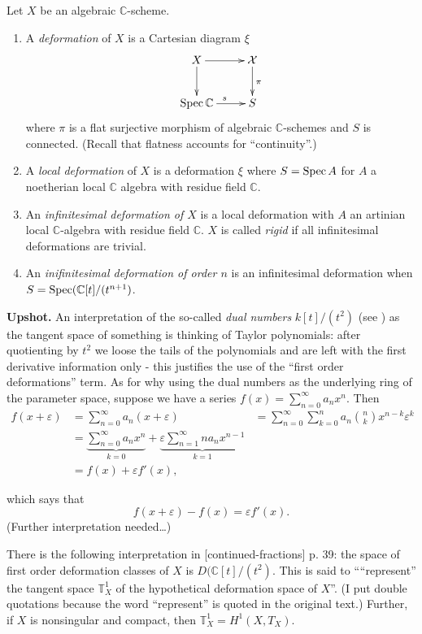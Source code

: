 \begin{definition}
\label{definition-deformation}
Let $X$ be an algebraic $\mathbb{C}$-scheme.
\begin{enumerate}
\item A {\it deformation} of $X$ is a Cartesian diagram $\xi$
$$
\xymatrix{
X\ar[r]\ar[d]&\mathcal{X}\ar[d]^{\pi}\\
\Spec \mathbb{C}\ar[r]^s&S
}
$$
where $\pi$ is a flat surjective morphism of algebraic $\mathbb{C}$-schemes and
$S$ is connected. (Recall that flatness accounts for ``continuity''.)
\item A {\it local deformation} of $X$ is a deformation $\xi$ where
$S=\mathop{\mathrm{Spec}} A$ for $A$ a noetherian local $\mathbb{C}$ algebra with residue
field $\mathbb{C}$.
\item An {\it infinitesimal deformation of $X$} is a local deformation with $A$
an artinian local $\mathbb{C}$-algebra with residue field $\mathbb{C}$. $X$ is
called {\it rigid} if all infinitesimal deformations are trivial.
\item An {\it inifinitesimal deformation of order $n$} is an infinitesimal
deformation when $S=\mathop{\mathrm{Spec}} (\mathbb{C}[t]/(t^{n+1})$.
\end{enumerate}
\end{definition}

{\bf Upshot.} An interpretation of the so-called {\it dual numbers}
$k[t]/(t^2)$ (see \cite{Hartshorne-deformation}) as the tangent space of
something is thinking of Taylor polynomials: after quotienting by $t^2$ we loose
the tails of the polynomials and are left with the first derivative information
only - this justifies the use of the ``first order deformations'' term.
As for why using the dual numbers as the underlying ring
of the parameter space, suppose we have a series
$f(x)=\sum_{n=0}^\infty a_nx^n$.
Then
 \begin{align*}
f(x+\varepsilon)&=\sum_{n=0}^\infty a_n(x+\varepsilon)
&=\sum_{n=0}^\infty\sum_{k=0}^na_n\binom{n}{k}x^{n-k}\varepsilon^k\\
&=\underbrace{\sum_{n=0}^\infty a_nx^n}_{k=0}
+\underbrace{\varepsilon\sum_{n=1}^\infty na_nx^{n-1}}_{k=1}\\
&=f(x)+\varepsilon f'(x),
\end{align*}

\noindent
which says that
$$
f(x+\varepsilon)-f(x)=\varepsilon f'(x).
$$
(Further interpretation needed…)


There is the following interpretation in [continued-fractions] p. 39: the space
of first order deformation classes of $X$ is $D(\mathbb{C}[t]/(t^2)$. This is
said to ````represent'' the tangent space $\mathbb{T}^1_X$ of the hypothetical
deformation space of $X$''. (I put double quotations because the word
``represent'' is quoted in the original text.) Further, if $X$ is nonsingular
and compact, then $\mathbb{T}^1_X=H^{1}(X,T_X)$.

